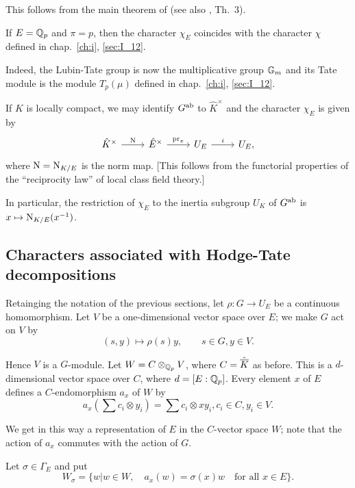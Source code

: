 \begin{subappendices}
This follows from the main theorem of \cite{17} (see also \cite[149]{6}, Th.~3).
\dpage

\begin{corp}
If $E = \mathbb{Q}_p$ and $\pi = p$, then the character $\chi_E$ coincides with the
character $\chi$ defined in chap.~\ref{ch:i}, \ref{sec:I_12}. 
\end{corp}

Indeed, the Lubin-Tate group is now the multiplicative group $\mathbb{G}_m$
and its Tate module is the module $T_p(\mu)$ defined in chap.~\ref{ch:i},
\ref{sec:I_12}.

\begin{obs}
If $K$ is locally compact, we may identify $G^{\mathrm{ab}}$ to $\hat{K}^\times$ and
the character $\chi_E$ is given by
\[\begin{tikzcd}
	\hat{K}^\times \rar["{\Nm}"] & \hat{E}^\times \rar["\pr_\pi"] & U_E
	\rar["i"] & U_E,
\end{tikzcd}\]
where $\operatorname{N} = \operatorname{N}_{K/E}$ is the norm map. [This follows from the functorial
properties of the ``reciprocity law'' of local class field theory.]

In particular, the restriction of $\chi_E$ to the inertia subgroup $U_K$ of
$G^{\mathrm{ab}}$ is $x \mapsto \operatorname{N}_{K/E}(x^{-1})$.
\end{obs}

\subsection{Characters associated with Hodge-Tate decompositions}
\label{sec:III_A5}

Retainging the notation of the previous sections, let $\rho \colon G \to U_E$ be
a continuous homomorphism. Let $V$ be a one-dimensional vector space over $E$;
we make $G$ act on $V$ by
\[
	(s,y) \mapsto \rho(s)y, \qquad s \in G, y \in V.
\]

Hence $V$ is a $G$-module. Let $W = C \otimes_{\mathbb{Q}_p} V$, where $C =
\hat{\overline{K}}$ as before.
\dpage
This is a $d$-dimensional vector space over $C$,
 where $d = [E : \mathbb{Q}_p]$. Every element $x$ of
$E$ defines a $C$-endomorphism $a_x$ of $W$ by
\[
	a_x(\sum c_i \otimes y_i) = \sum c_i \otimes xy_i, c_i \in C, y_i \in V.
\]

We get in this way a representation of $E$ in the $C$-vector space $W$; note
that the action of $a_x$ commutes with the action of $G$. 

Let $\sigma \in \Gamma_E$ and put
\[
	W_\sigma = \{ w | w \in  W, \quad a_x(w) = \sigma(x) w \quad \text{for
all } x \in E\}.
\]


\end{subappendices}
